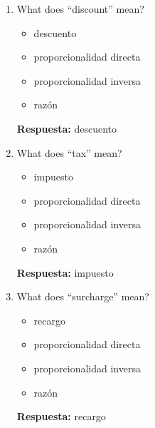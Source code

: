 \documentclass[11pt,a4paper]{article}
\begin{document}
\begin{enumerate}
\item What does ``discount'' mean?
\begin{itemize}
\item descuento
\item proporcionalidad directa
\item proporcionalidad inversa
\item razón
\end{itemize}
\textbf{Respuesta:} descuento
\item What does ``tax'' mean?
\begin{itemize}
\item impuesto
\item proporcionalidad directa
\item proporcionalidad inversa
\item razón
\end{itemize}
\textbf{Respuesta:} impuesto
\item What does ``surcharge'' mean?
\begin{itemize}
\item recargo
\item proporcionalidad directa
\item proporcionalidad inversa
\item razón
\end{itemize}
\textbf{Respuesta:} recargo
\end{enumerate}
\end{document}
